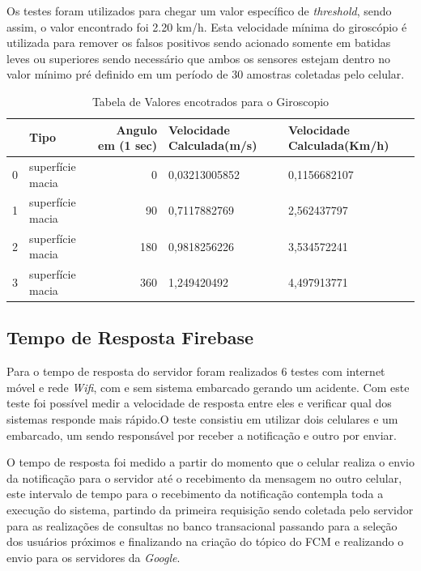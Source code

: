 Os testes foram utilizados para  chegar um valor específico de \textit{threshold}, sendo assim,  o valor encontrado foi  2.20 km/h.  Esta velocidade mínima do giroscópio é utilizada para remover os falsos positivos sendo acionado somente em batidas leves ou superiores  sendo necessário que ambos os sensores estejam dentro no valor mínimo pré definido em um período de 30 amostras coletadas pelo celular.

\begin{table}[H]
\caption{Tabela de Valores encotrados para o Giroscopio}
\begin{adjustbox}{width=\columnwidth,center}

\begin{tabular}{llrll}
\toprule
{} &  Tipo &  Angulo em  (1 sec) & Velocidade Calculada(m/s) & Velocidade Calculada(Km/h) \\
\midrule
0 &  superfície macia &                   0 &             0,03213005852 &               0,1156682107 \\
1 &  superfície macia &                  90 &              0,7117882769 &                2,562437797 \\
2 &  superfície macia &                 180 &              0,9818256226 &                3,534572241 \\
3 &  superfície macia &                 360 &               1,249420492 &                4,497913771 \\
\bottomrule
\end{tabular}

\end{adjustbox}
\end{table}





\subsection{\textbf{Tempo de Resposta Firebase}}

Para o tempo  de resposta do servidor foram realizados 6 testes com internet móvel e rede \textit{Wifi}, com  e sem  sistema embarcado gerando um acidente. Com este  teste foi possível medir a velocidade de resposta entre eles e verificar qual dos sistemas responde mais rápido.O teste consistiu em utilizar dois celulares e um embarcado, um sendo responsável por receber a notificação e outro por enviar.

O tempo de resposta foi medido a  partir do momento que o celular realiza o envio da  notificação para o servidor até o recebimento da mensagem no outro celular, este intervalo de tempo  para o recebimento da notificação contempla toda a execução do sistema, partindo da primeira requisição sendo coletada  pelo servidor para as realizações de consultas no banco transacional passando para a seleção dos usuários próximos e finalizando na criação do tópico do FCM e realizando o envio para os servidores da \textit{Google}.

